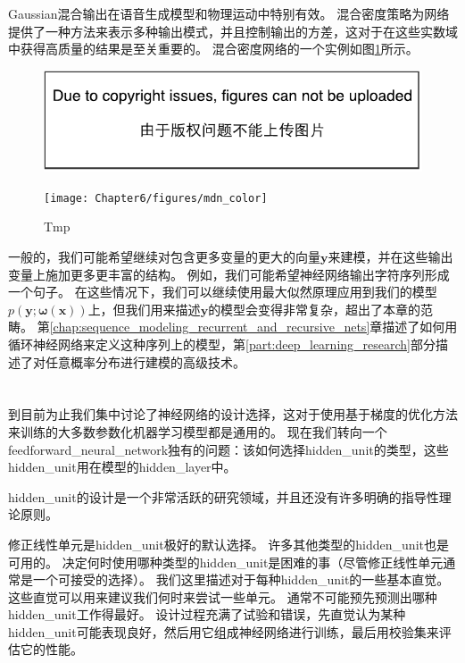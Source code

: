 
Gaussian混合输出在语音生成模型\citep{schuster1999supervised}和物理运动\citep{Graves-arxiv2013}中特别有效。
混合密度策略为网络提供了一种方法来表示多种输出模式，并且控制输出的方差，这对于在这些实数域中获得高质量的结果是至关重要的。
混合密度网络的一个实例如图\ref{fig:chap6_mdn_color}所示。
\begin{figure}[!htb]
\ifOpenSource
\centerline{\includegraphics{figure.pdf}}
\else
\centerline{\texttt{[image: Chapter6/figures/mdn\_color]}}
\fi
\caption{Tmp}
\label{fig:chap6_mdn_color}
\end{figure}


一般的，我们可能希望继续对包含更多变量的更大的向量$\bm{y}$来建模，并在这些输出变量上施加更多更丰富的结构。
例如，我们可能希望神经网络输出字符序列形成一个句子。
在这些情况下，我们可以继续使用最大似然原理应用到我们的模型$p(\bm{y};\bm{\omega}(\bm{x}))$上，但我们用来描述$\bm{y}$的模型会变得非常复杂，超出了本章的范畴。
第\ref{chap:sequence_modeling_recurrent_and_recursive_nets}章描述了如何用循环神经网络来定义这种序列上的模型，第\ref{part:deep_learning_research}部分描述了对任意概率分布进行建模的高级技术。

\section{}
\label{sec:hidden_units}

到目前为止我们集中讨论了神经网络的设计选择，这对于使用基于梯度的优化方法来训练的大多数参数化机器学习模型都是通用的。
现在我们转向一个\gls{feedforward_neural_network}独有的问题：该如何选择\gls{hidden_unit}的类型，这些\gls{hidden_unit}用在模型的\gls{hidden_layer}中。


\gls{hidden_unit}的设计是一个非常活跃的研究领域，并且还没有许多明确的指导性理论原则。

修正线性单元是\gls{hidden_unit}极好的默认选择。
许多其他类型的\gls{hidden_unit}也是可用的。
决定何时使用哪种类型的\gls{hidden_unit}是困难的事（尽管修正线性单元通常是一个可接受的选择）。
我们这里描述对于每种\gls{hidden_unit}的一些基本直觉。
这些直觉可以用来建议我们何时来尝试一些单元。
通常不可能预先预测出哪种\gls{hidden_unit}工作得最好。
设计过程充满了试验和错误，先直觉认为某种\gls{hidden_unit}可能表现良好，然后用它组成神经网络进行训练，最后用校验集来评估它的性能。

